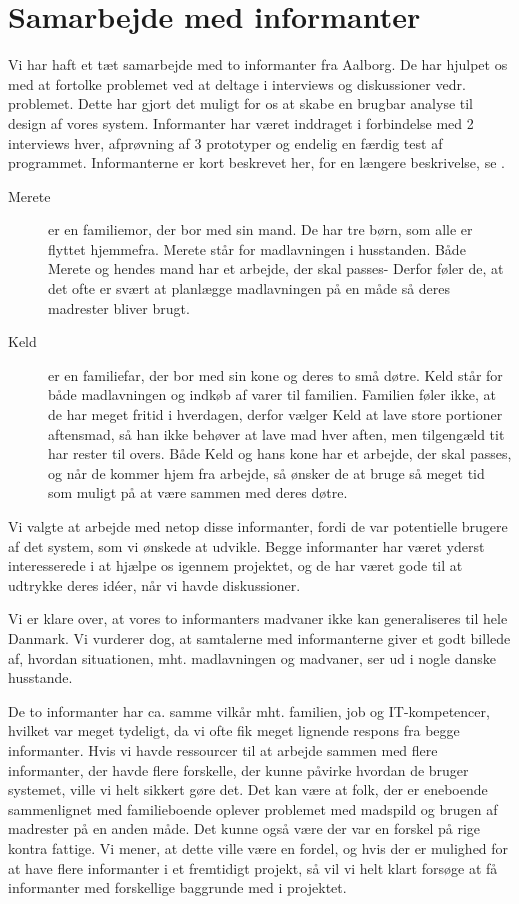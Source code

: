 \chapter{Samarbejde med informanter}
\label{akademiskinformanter}

Vi har haft et tæt samarbejde med to informanter fra Aalborg. De har hjulpet os med at fortolke problemet ved at deltage i interviews og diskussioner vedr. problemet. Dette har gjort det muligt for os at skabe en brugbar analyse til design af vores system. Informanter har været inddraget i forbindelse med 2 interviews hver, afprøvning af 3 prototyper og endelig en færdig test af programmet. Informanterne er kort beskrevet her, for en længere beskrivelse, se .

\begin{description}
\item[Merete] er en familiemor, der bor med sin mand. De har tre børn, som alle er flyttet hjemmefra. Merete står for madlavningen i husstanden. Både Merete og hendes mand har et arbejde, der skal passes- Derfor føler de, at det ofte er svært at planlægge madlavningen på en måde så deres madrester bliver brugt.

\item[Keld] er en familiefar, der bor med sin kone og deres to små døtre. Keld står for både madlavningen og indkøb af varer til familien. Familien føler ikke, at de har meget fritid i hverdagen, derfor vælger Keld at lave store portioner aftensmad, så han ikke behøver at lave mad hver aften, men tilgengæld tit har rester til overs. Både Keld og hans kone har et arbejde, der skal passes, og når de kommer hjem fra arbejde, så ønsker de at bruge så meget tid som muligt på at være sammen med deres døtre.
\end{description}

Vi valgte at arbejde med netop disse informanter, fordi de var potentielle brugere af det system, som vi ønskede at udvikle. Begge informanter har været yderst interesserede i at hjælpe os igennem projektet, og de har været gode til at udtrykke deres idéer, når vi havde diskussioner.

Vi er klare over, at vores to informanters madvaner ikke kan generaliseres til hele Danmark. Vi vurderer dog, at samtalerne med informanterne giver et godt billede af, hvordan situationen, mht. madlavningen og madvaner, ser ud i nogle danske husstande. 

De to informanter har ca. samme vilkår mht. familien, job og IT-kompetencer, hvilket var meget tydeligt, da vi ofte fik meget lignende respons fra begge informanter. Hvis vi havde ressourcer til at arbejde sammen med flere informanter, der havde flere forskelle, der kunne påvirke hvordan de bruger systemet, ville vi helt sikkert gøre det. Det kan være at folk, der er eneboende sammenlignet med familieboende oplever problemet med madspild og brugen af madrester på en anden måde. Det kunne også være der var en forskel på rige kontra fattige. Vi mener, at dette ville være en fordel, og hvis der er mulighed for at have flere informanter i et fremtidigt projekt, så vil vi helt klart forsøge at få informanter med forskellige baggrunde med i projektet.

